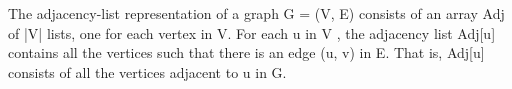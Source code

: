 \documentclass[preview]{standalone}
\begin{document}
\begin{center}
The adjacency-list representation of a graph G = (V, E) consists of an array Adj of |V| lists,
 one for each vertex in V. For each u in V , 
 the adjacency list Adj[u] contains all the vertices such that there is an edge (u, v) in E. 
 That is, Adj[u] consists of all the vertices adjacent to u in G.
\end{center}
\end{document}
